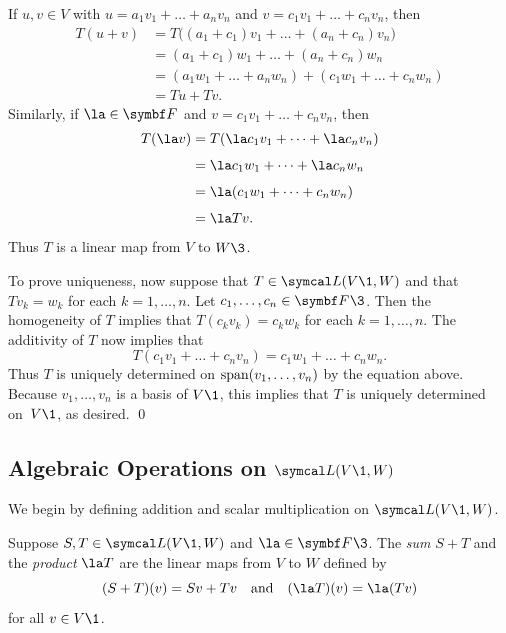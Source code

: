 If $u, v \in V$ with $u = a_1 v_1 + \dots + a_n v_n$ and $v = c_1 v_1 + \dots + c_n v_n$, then
\begin{align*}
T(u + v) &= T\bigl( (a_1 + c_1) v_1 + \dots + (a_n + c_n) v_n \bigr)\\[4bp]
&= (a_1 + c_1) w_1 + \dots + (a_n + c_n) w_n\\[4bp]
&= (a_1 w_1 + \dots + a_n w_n) + (c_1 w_1 + \dots + c_n w_n)\\[4bp]
&= Tu + Tv.
\end{align*}
Similarly, if $\la \in \F{}$ and $v = c_1 v_1 + \dots + c_n v_n$, then
\begin{align*}
T(\la v) &= T( \la c_1 v_1 + \dots + \la c_n v_n) \\[4bp]
&= \la c_1 w_1 + \dots + \la c_n w_n \\[4bp]
&= \la (c_1 w_1 + \dots + c_n w_n) \\[4bp]
&= \la Tv.
\end{align*}
Thus $T$ is a linear map from $V$ to $W\3$.

To prove uniqueness, now suppose that $T \in \L(V\1,W)$ and that $Tv_k = w_k$ for each $k = 1, \dots, n$. Let $c_1, \dots, c_n \in \F{}\3$. Then the homogeneity of $T$ implies that $T(c_k v_k) = c_k w_k$ for each $k = 1, \dots, n$. The additivity of $T$ now implies that
\[
T(c_1 v_1 + \dots + c_n v_n) = c_1 w_1 + \dots + c_n w_n.
\]
Thus $T$ is uniquely determined on $\operatorname{span}(v_1, \dots, v_n)$ by the equation above. Because $v_1, \dots, v_n$ is a basis of $V\1$, this implies that $T$ is uniquely determined on~$V\1$, as desired.
\qed

    \subsection{Algebraic Operations on $\L(V\1, W)$}

We begin by defining addition and scalar multiplication on $\L(V\1,W)$.

{Suppose $S, T \in \L(V\1,W)$ and $\la \in \F{}\3$. The \emph{sum} $S + T$ and the \emph{product} $\la T$ are the linear maps from $V$ to $W$ defined by
\[
(S+T)(v) = Sv + Tv \andd (\la T)(v) = \la (Tv)
\]
for all $v \in V\1$.
}

